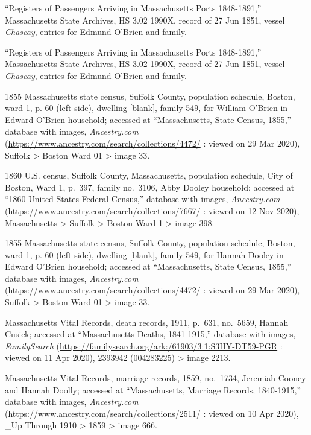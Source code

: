 \begin{thebibliography}{999}
``Registers of Passengers Arriving in Massachusetts Ports 1848-1891,'' Massachusetts State Archives, HS 3.02 1990X, record of 27 Jun 1851, vessel \textit{Chascay}, entries for Edmund O'Brien and family.

``Registers of Passengers Arriving in Massachusetts Ports 1848-1891,'' Massachusetts State Archives, HS 3.02 1990X, record of 27 Jun 1851, vessel \textit{Chascay}, entries for Edmund O'Brien and family.

1855 Massachusetts state census, Suffolk County, population schedule, Boston, ward 1, p. 60 (left side), dwelling [blank], family 549, for William O'Brien in Edward O'Brien household; accessed at ``Massachusetts, State Census, 1855,'' database with images, \textit{Ancestry.com} (\url{https://www.ancestry.com/search/collections/4472/} : viewed on 29 Mar 2020), Suffolk > Boston Ward 01 > image 33.

1860 U.S. census, Suffolk County, Massachusetts, population schedule, City of Boston, Ward 1, p.\ 397, family no.\ 3106, Abby Dooley household; accessed at ``1860 United States Federal Census,'' database with images, \textit{Ancestry.com} (\url{https://www.ancestry.com/search/collections/7667/} : viewed on 12 Nov 2020), Massachusetts > Suffolk > Boston Ward 1 > image 398.

1855 Massachusetts state census, Suffolk County, population schedule, Boston, ward 1, p. 60 (left side), dwelling [blank], family 549, for Hannah Dooley in Edward O'Brien household; accessed at ``Massachusetts, State Census, 1855,'' database with images, \textit{Ancestry.com} (\url{https://www.ancestry.com/search/collections/4472/} : viewed on 29 Mar 2020), Suffolk > Boston Ward 01 > image 33.

Massachusetts Vital Records, death records, 1911, p.\ 631, no.\ 5659, Hannah Cusick; accessed at ``Massachusetts Deaths, 1841-1915,'' database with images, \textit{FamilySearch} (\url{https://familysearch.org/ark:/61903/3:1:S3HY-DT59-PGR} : viewed on 11 Apr 2020), 2393942 (004283225) > image 2213.

Massachusetts Vital Records, marriage records, 1859, no.\ 1734, Jeremiah Cooney and Hannah Doolly; accessed at ``Massachusetts, Marriage Records, 1840-1915,'' database with images, \textit{Ancestry.com} (\url{https://www.ancestry.com/search/collections/2511/} : viewed on 10 Apr 2020), \_Up Through 1910 > 1859 > image 666.


\end{thebibliography}
